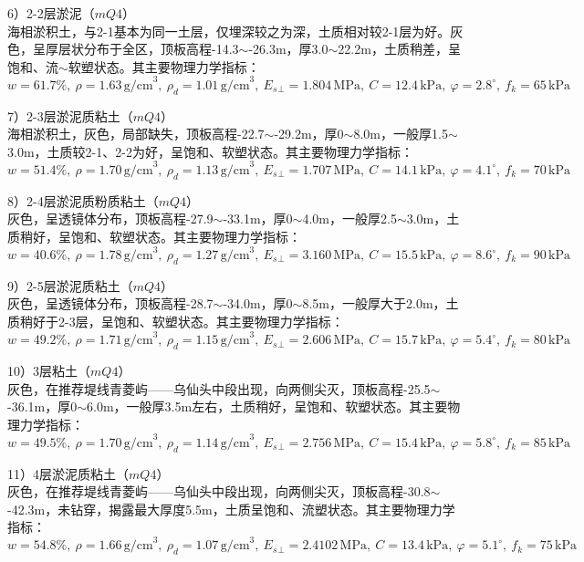 \documentclass[UTF8, a4paper, 12pt]{ctexart} %
\begin{document}
\par 6）2-2层淤泥（$mQ4$）\\
海相淤积土，与2-1基本为同一土层，仅埋深较之为深，土质相对较2-1层为好。灰色，呈厚层状分布于全区，顶板高程-14.3$\sim$-26.3m，厚3.0$\sim$22.2m，土质稍差，呈饱和、流$\sim$软塑状态。其主要物理力学指标：
\[
w=61.7\%,\ \rho=1.63\, \text{g/cm}^3,\ \rho_d=1.01\, \text{g/cm}^3,\ E_s{_\perp}=1.804\, \text{MPa},\ C=12.4\, \text{kPa},\ \varphi=2.8^\circ,\ f_k=65\, \text{kPa}
\]

\par 7）2-3层淤泥质粘土（$mQ4$）\\
海相淤积土，灰色，局部缺失，顶板高程-22.7$\sim$-29.2m，厚0$\sim$8.0m，一般厚1.5$\sim$3.0m，土质较2-1、2-2为好，呈饱和、软塑状态。其主要物理力学指标：
\[
w=51.4\%,\ \rho=1.70\, \text{g/cm}^3,\ \rho_d=1.13\, \text{g/cm}^3,\ E_s{_\perp}=1.707\, \text{MPa},\ C=14.1\, \text{kPa},\ \varphi=4.1^\circ,\ f_k=70\, \text{kPa}
\]

\par 8）2-4层淤泥质粉质粘土（$mQ4$）\\
灰色，呈透镜体分布，顶板高程-27.9$\sim$-33.1m，厚0$\sim$4.0m，一般厚2.5$\sim$3.0m，土质稍好，呈饱和、软塑状态。其主要物理力学指标：
\[
w=40.6\%,\ \rho=1.78\, \text{g/cm}^3,\ \rho_d=1.27\, \text{g/cm}^3,\ E_s{_\perp}=3.160\, \text{MPa},\ C=15.5\, \text{kPa},\ \varphi=8.6^\circ,\ f_k=90\, \text{kPa}
\]

\par 9）2-5层淤泥质粘土（$mQ4$）\\
灰色，呈透镜体分布，顶板高程-28.7$\sim$-34.0m，厚0$\sim$8.5m，一般厚大于2.0m，土质稍好于2-3层，呈饱和、软塑状态。其主要物理力学指标：
\[
w=49.2\%,\ \rho=1.71\, \text{g/cm}^3,\ \rho_d=1.15\, \text{g/cm}^3,\ E_s{_\perp}=2.606\, \text{MPa},\ C=15.7\, \text{kPa},\ \varphi=5.4^\circ,\ f_k=80\, \text{kPa}
\]

\par 10）3层粘土（$mQ4$）\\
灰色，在推荐堤线青菱屿——乌仙头中段出现，向两侧尖灭，顶板高程-25.5$\sim$-36.1m，厚0$\sim$6.0m，一般厚3.5m左右，土质稍好，呈饱和、软塑状态。其主要物理力学指标：
\[
w=49.5\%,\ \rho=1.70\, \text{g/cm}^3,\ \rho_d=1.14\, \text{g/cm}^3,\ E_s{_\perp}=2.756\, \text{MPa},\ C=15.4\, \text{kPa},\ \varphi=5.8^\circ,\ f_k=85\, \text{kPa}
\]

\par 11）4层淤泥质粘土（$mQ4$）\\
灰色，在推荐堤线青菱屿——乌仙头中段出现，向两侧尖灭，顶板高程-30.8$\sim$-42.3m，未钻穿，揭露最大厚度5.5m，土质呈饱和、流塑状态。其主要物理力学指标：
\[
w=54.8\%,\ \rho=1.66\, \text{g/cm}^3,\ \rho_d=1.07\, \text{g/cm}^3,\ E_s{_\perp}=2.4102\, \text{MPa},\ C=13.4\, \text{kPa},\ \varphi=5.1^\circ,\ f_k=75\, \text{kPa}
\]
\end{document}

